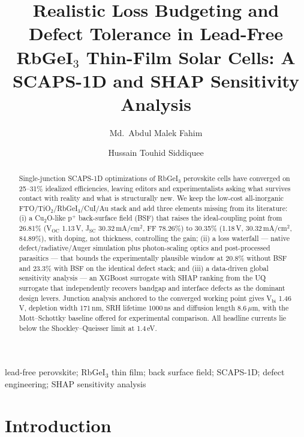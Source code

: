 \documentclass[review]{elsarticle}
\begin{document}
\begin{frontmatter}
\title{Realistic Loss Budgeting and Defect Tolerance in Lead-Free RbGeI$_{3}$ Thin-Film Solar Cells: A SCAPS-1D and SHAP Sensitivity Analysis}
\author[lus]{Md.\ Abdul Malek Fahim}
\author[lus]{Hussain Touhid Siddiquee}
\address[lus]{Department of Electrical and Electronic Engineering, Leading University, Sylhet, Bangladesh}
\begin{abstract}
Single-junction SCAPS-1D optimizations of RbGeI$_{3}$ perovskite cells have converged on 25--31\% idealized efficiencies, leaving editors and experimentalists asking what survives contact with reality and what is structurally new. We keep the low-cost all-inorganic FTO/TiO$_{2}$/RbGeI$_{3}$/CuI/Au stack and add three elements missing from its literature: (i) a Cu$_{2}$O-like p$^{+}$ back-surface field (BSF) that raises the ideal-coupling point from 26.81\% (V$_{\mathrm{OC}}$ 1.13\,V, J$_{\mathrm{SC}}$ 30.32\,mA/cm$^{2}$, FF 78.26\%) to 30.35\% (1.18\,V, 30.32\,mA/cm$^{2}$, 84.89\%), with doping, not thickness, controlling the gain; (ii) a loss waterfall --- native defect/radiative/Auger simulation plus photon-scaling optics and post-processed parasitics --- that bounds the experimentally plausible window at 20.8\% without BSF and 23.3\% with BSF on the identical defect stack; and (iii) a data-driven global sensitivity analysis --- an XGBoost surrogate with SHAP ranking from the UQ surrogate that independently recovers bandgap and interface defects as the dominant design levers. Junction analysis anchored to the converged working point gives V$_{\mathrm{bi}}$ 1.46\,V, depletion width 171\,nm, SRH lifetime 1000\,ns and diffusion length 8.6\,$\mu$m, with the Mott--Schottky baseline offered for experimental comparison. All headline currents lie below the Shockley--Queisser limit at 1.4\,eV.
\end{abstract}
\begin{keyword}
lead-free perovskite; RbGeI$_{3}$ thin film; back surface field; SCAPS-1D; defect engineering; SHAP sensitivity analysis
\end{keyword}
\end{frontmatter}

\section{Introduction}
\end{document}
